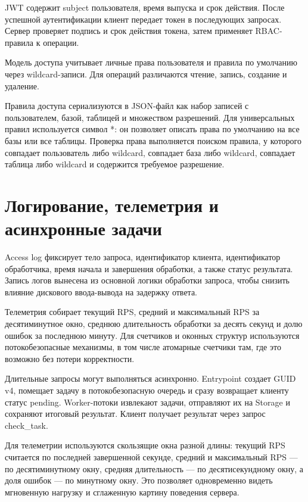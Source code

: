 \documentclass[a4paper,14pt]{extarticle}
\renewcommand{\texttt}[1]{\textrm{#1}}
\begin{document}
JWT содержит subject пользователя, время выпуска и срок действия. После успешной аутентификации клиент передает токен в последующих запросах. Сервер проверяет подпись и срок действия токена, затем применяет RBAC-правила к операции.

Модель доступа учитывает личные права пользователя и правила по умолчанию через wildcard-записи. Для операций различаются чтение, запись, создание и удаление.

Правила доступа сериализуются в JSON-файл как набор записей с пользователем, базой, таблицей и множеством разрешений. Для универсальных правил используется символ \texttt{*}: он позволяет описать права по умолчанию на все базы или все таблицы. Проверка права выполняется поиском правила, у которого совпадает пользователь либо wildcard, совпадает база либо wildcard, совпадает таблица либо wildcard и содержится требуемое разрешение.

\section{Логирование, телеметрия и асинхронные задачи}

Access log фиксирует тело запроса, идентификатор клиента, идентификатор обработчика, время начала и завершения обработки, а также статус результата. Запись логов вынесена из основной логики обработки запроса, чтобы снизить влияние дискового ввода-вывода на задержку ответа.

Телеметрия собирает текущий RPS, средний и максимальный RPS за десятиминутное окно, среднюю длительность обработки за десять секунд и долю ошибок за последнюю минуту. Для счетчиков и оконных структур используются потокобезопасные механизмы, в том числе атомарные счетчики там, где это возможно без потери корректности.

Длительные запросы могут выполняться асинхронно. Entrypoint создает GUID v4, помещает задачу в потокобезопасную очередь и сразу возвращает клиенту статус \texttt{pending}. Worker-потоки извлекают задачи, отправляют их на Storage и сохраняют итоговый результат. Клиент получает результат через запрос \texttt{check\_task}.

Для телеметрии используются скользящие окна разной длины: текущий RPS считается по последней завершенной секунде, средний и максимальный RPS — по десятиминутному окну, средняя длительность — по десятисекундному окну, а доля ошибок — по минутному окну. Это позволяет одновременно видеть мгновенную нагрузку и сглаженную картину поведения сервера.
\end{document}

